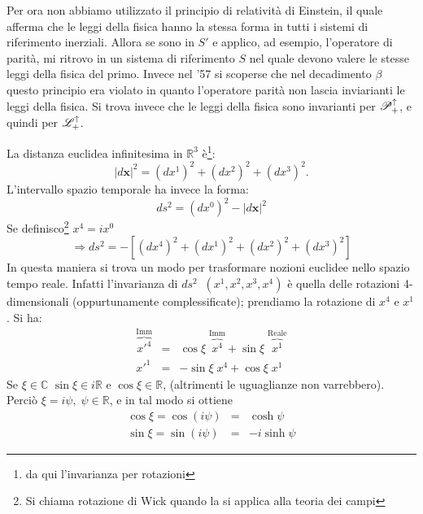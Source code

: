 \begin{osservazione}
Per ora non abbiamo utilizzato il principio di relativit\`a di Einstein,
il quale afferma che le leggi della fisica hanno la stessa forma in
tutti i sistemi di riferimento inerziali. Allora se sono in $ S' $ e
applico, ad esempio, l'operatore di parit\`a, mi ritrovo in un sistema
di riferimento $S$ nel quale devono valere le stesse leggi della fisica
del primo.  Invece nel '57 si scoperse che nel decadimento $\beta$
questo principio era violato in quanto l'operatore parit\`a non lascia
inviarianti le leggi della fisica. Si trova invece che le leggi della
fisica sono invarianti per $\mathscr{P}_{+}^{\uparrow}$, e quindi per
$\mathscr{L}_{+}^{\uparrow}$.
\end{osservazione}
\begin{osservazione} La distanza euclidea
infinitesima in $\mathbb{R}^3$ \`e\footnote{
da qui l'invarianza per rotazioni}:
\begin{equation}
 |d\mathbf{x}|^2=(dx^1)^2+(dx^2)^2+(dx^3)^2.
\end{equation}
L'intervallo spazio temporale ha invece la forma:
\begin{equation}
 ds^2=(dx^0)^2-|d\mathbf{x}|^2
\end{equation}
Se definisco\footnote{Si chiama rotazione di Wick quando la si applica
alla teoria dei campi} $x^4=ix^0$
\begin{equation}
 \Rightarrow ds^2=-[(dx^4)^2+(dx^1)^2+(dx^2)^2+(dx^3)^2]
\end{equation}
In questa maniera si trova un modo per trasformare nozioni
euclidee nello spazio tempo reale. Infatti l'invarianza di
$ds^2\;\;(x^1,x^2,x^3,x^4)$ \`e quella delle rotazioni
4-dimensionali (oppurtunamente complessificate); prendiamo la
rotazione di $x^4$ e $x^1$. Si ha:
\begin{eqnarray*}
\stackrel{\mathrm{Imm}}{\overbrace{x'^4}} & =
 &\cos\xi\;\stackrel{\mathrm{Imm}}{\overbrace{x^4}} 
+ \sin\xi\;\stackrel{\mathrm{Reale}}{\overbrace{x^1}}\\
x'^1&=&-\sin\xi\; x^4 + \cos \xi\; x^1\
\label{eq:sincos}
\end{eqnarray*}
Se $\xi\in\mathbb{C}$ $\sin\xi\in i\mathbb{R}$ e $\cos\xi\in\mathbb{R}$,
(altrimenti le uguaglianze non varrebbero). Perci\`o
$\xi=i\psi,\;\psi\in\mathbb{R}$, e in tal modo si ottiene
\begin{eqnarray*}
\cos\xi=\cos(i\psi)&=&\cosh\psi\\
\sin\xi=\sin(i\psi)&=& - i \sinh\psi
\label{eq:sinhcosh}
\end{eqnarray*}

\end{osservazione}
